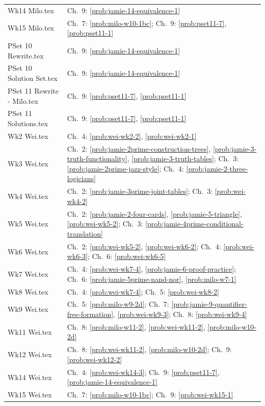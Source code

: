 \documentclass[11pt,letterpaper,oneside,openany]{book}
\begin{document}
\begin{longtable}{@{}p{}p{}@{}}
Wk14 Milo.tex & Ch.~9: \ref{prob:jamie-14-equivalence-1} \\
Wk15 Milo.tex & Ch.~7: \ref{prob:milo-w10-1bc}; Ch.~9: \ref{prob:pset11-7}, \ref{prob:pset11-1} \\
PSet 10 Rewrite.tex & Ch.~9: \ref{prob:jamie-14-equivalence-1} \\
PSet 10 Solution Set.tex & Ch.~9: \ref{prob:jamie-14-equivalence-1} \\
PSet 11 Rewrite - Milo.tex & Ch.~9: \ref{prob:pset11-7}, \ref{prob:pset11-1} \\
PSet 11 Solutions.tex & Ch.~9: \ref{prob:pset11-7}, \ref{prob:pset11-1} \\
Wk2 Wei.tex & Ch.~4: \ref{prob:wei-wk2-2}, \ref{prob:wei-wk2-1} \\
Wk3 Wei.tex & Ch.~2: \ref{prob:jamie-2prime-construction-trees}, \ref{prob:jamie-3-truth-functionality}, \ref{prob:jamie-3-truth-tables}; Ch.~3: \ref{prob:jamie-2prime-jazz-style}; Ch.~4: \ref{prob:jamie-2-three-logicians} \\
Wk4 Wei.tex & Ch.~2: \ref{prob:jamie-3prime-joint-tables}; Ch.~3: \ref{prob:wei-wk4-2} \\
Wk5 Wei.tex & Ch.~2: \ref{prob:jamie-2-four-cards}, \ref{prob:jamie-5-triangle}, \ref{prob:wei-wk5-2}; Ch.~3: \ref{prob:jamie-4prime-conditional-translation} \\
Wk6 Wei.tex & Ch.~2: \ref{prob:wei-wk5-2}, \ref{prob:wei-wk6-2}; Ch.~4: \ref{prob:wei-wk6-3}; Ch.~6: \ref{prob:wei-wk6-5} \\
Wk7 Wei.tex & Ch.~4: \ref{prob:wei-wk7-4}, \ref{prob:jamie-6-proof-practice}; Ch.~6: \ref{prob:jamie-5prime-nand-nor}, \ref{prob:milo-w7-1} \\
Wk8 Wei.tex & Ch.~4: \ref{prob:wei-wk7-4}; Ch.~5: \ref{prob:wei-wk8-2} \\
Wk9 Wei.tex & Ch.~5: \ref{prob:milo-w9-2d}; Ch.~7: \ref{prob:jamie-9-quantifier-free-formation}, \ref{prob:wei-wk9-3}; Ch.~8: \ref{prob:wei-wk9-4} \\
Wk11 Wei.tex & Ch.~8: \ref{prob:milo-w11-2}, \ref{prob:wei-wk11-2}, \ref{prob:milo-w10-2d} \\
Wk12 Wei.tex & Ch.~8: \ref{prob:wei-wk11-2}, \ref{prob:milo-w10-2d}; Ch.~9: \ref{prob:wei-wk12-2} \\
Wk14 Wei.tex & Ch.~4: \ref{prob:wei-wk14-3}; Ch.~9: \ref{prob:pset11-7}, \ref{prob:jamie-14-equivalence-1} \\
Wk15 Wei.tex & Ch.~7: \ref{prob:milo-w10-1bc}; Ch.~9: \ref{prob:wei-wk15-1} \\
\bottomrule\end{longtable}\normalsize
\end{document}

